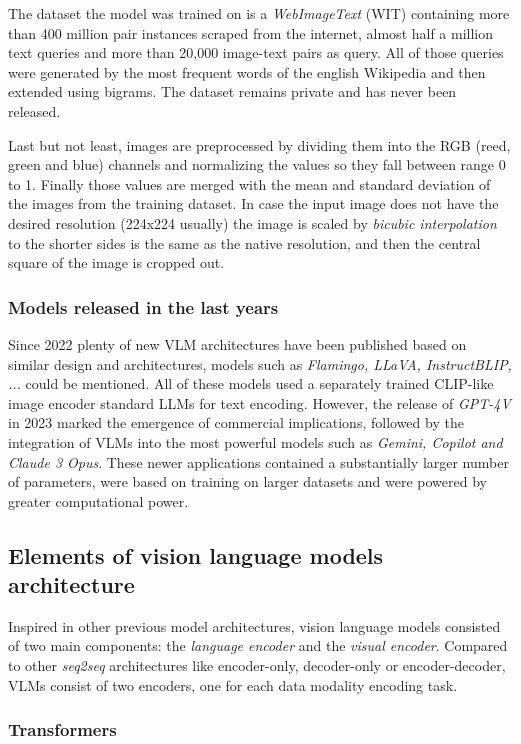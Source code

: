 The dataset the model was trained on is a \textit{WebImageText} (WIT) containing more than 400 million pair instances scraped from the internet, almost half a million text queries and more than 20,000 image-text pairs as query. All of those queries were generated by the most frequent words of the english Wikipedia and then extended using bigrams. The dataset remains private and has never been released. 

Last but not least, images are preprocessed by dividing them into the RGB (reed, green and blue) channels and normalizing the values so they fall between range 0 to 1. Finally those values are merged with the mean and standard deviation of the images from the training dataset. In case the input image does not have the desired resolution (224x224 usually) the image is scaled by \textit{bicubic interpolation} \cite{wiki:bicubic_interpolation} to the shorter sides is the same as the native resolution, and then the central square of the image is cropped out. 

\subsubsection{Models released in the last years}
Since 2022 plenty of new VLM architectures have been published based on similar design and architectures, models such as \textit{Flamingo, LLaVA, InstructBLIP, ...} could be mentioned. All of these models used a separately trained CLIP-like image encoder standard LLMs for text encoding. However, the release of \textit{GPT-4V} in 2023 marked the emergence of commercial implications, followed by the integration of VLMs into the most powerful models such as \textit{Gemini, Copilot and Claude 3 Opus}. These newer applications contained a substantially larger number of parameters, were based on training on larger datasets and were powered by greater computational power.

\subsection{Elements of vision language models architecture}
Inspired in other previous model architectures, vision language models consisted of two main components: the \textit{language encoder} and the \textit{visual encoder}. Compared to other \textit{seq2seq} architectures like encoder-only, decoder-only or encoder-decoder, VLMs consist of two encoders, one for each data modality encoding task.

\subsubsection{Transformers}


